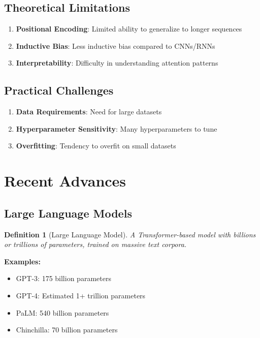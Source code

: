 \documentclass[11pt,a4paper]{article}
\newtheorem{definition}[theorem]{Definition}
\begin{document}
\subsection{Theoretical Limitations}

\begin{enumerate}
\item \textbf{Positional Encoding}: Limited ability to generalize to longer sequences
\item \textbf{Inductive Bias}: Less inductive bias compared to CNNs/RNNs
\item \textbf{Interpretability}: Difficulty in understanding attention patterns
\end{enumerate}

\subsection{Practical Challenges}

\begin{enumerate}
\item \textbf{Data Requirements}: Need for large datasets
\item \textbf{Hyperparameter Sensitivity}: Many hyperparameters to tune
\item \textbf{Overfitting}: Tendency to overfit on small datasets
\end{enumerate}

\section{Recent Advances}

\subsection{Large Language Models}

\begin{definition}[Large Language Model]
A Transformer-based model with billions or trillions of parameters, trained on massive text corpora.
\end{definition}

\textbf{Examples:}
\begin{itemize}
\item GPT-3: 175 billion parameters
\item GPT-4: Estimated 1+ trillion parameters
\item PaLM: 540 billion parameters
\item Chinchilla: 70 billion parameters
\end{itemize}
\end{document}
